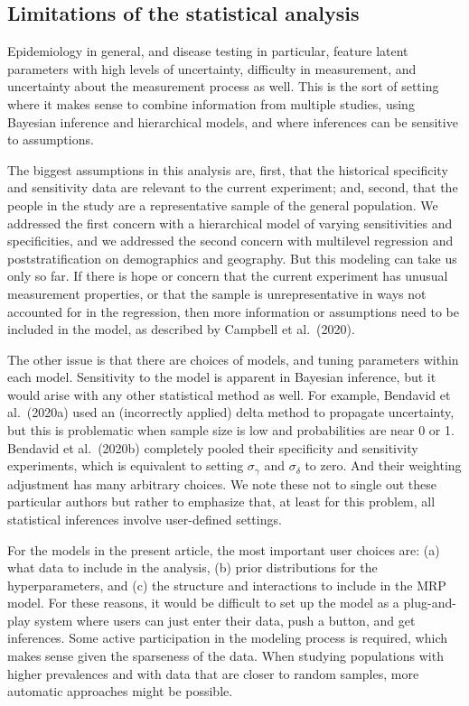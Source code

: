 \documentclass[11pt]{article}
\begin{document}
\subsection{Limitations of the statistical analysis}

Epidemiology in general, and disease testing in particular, feature
latent parameters with high levels of uncertainty, difficulty in
measurement, and uncertainty about the measurement process as well.
This is the sort of setting where it makes sense to combine
information from multiple studies, using Bayesian inference and
hierarchical models, and where inferences can be sensitive to
assumptions.

The biggest assumptions in this analysis are, first, that the
historical specificity and sensitivity data are relevant to the
current experiment; and, second, that the people in the study are a
representative sample of the general population.  We addressed the
first concern with a hierarchical model of varying sensitivities and
specificities, and we addressed the second concern with multilevel
regression and poststratification on demographics and geography.  But
this modeling can take us only so far.  If there is hope or concern
that the current experiment has unusual measurement properties, or
that the sample is unrepresentative in ways not accounted for in the
regression, then more information or assumptions need to be included
in the model, as described by Campbell et al.\ (2020).

The other issue is that there are choices of models, and tuning
parameters within each model.  Sensitivity to the model is apparent in
Bayesian inference, but it would arise with any other statistical
method as well.  For example, Bendavid et al.\ (2020a) used an
(incorrectly applied) delta method to propagate uncertainty, but this
is problematic when sample size is low and probabilities are near 0 or
1.  Bendavid et al.\ (2020b) completely pooled their specificity and
sensitivity experiments, which is equivalent to setting
$\sigma_{\gamma}$ and $\sigma_{\delta}$ to zero.  And their weighting
adjustment has many arbitrary choices.  We note these not to single
out these particular authors but rather to emphasize that, at least
for this problem, all statistical inferences involve user-defined
settings.

For the models in the present article, the most important user choices
are: (a) what data to include in the analysis, (b) prior distributions
for the hyperparameters, and (c) the structure and interactions to
include in the MRP model.  For these reasons, it would be difficult to
set up the model as a plug-and-play system where users can just enter
their data, push a button, and get inferences.  Some active
participation in the modeling process is required, which makes sense
given the sparseness of the data.  When studying populations with
higher prevalences and with data that are closer to random samples,
more automatic approaches might be possible.
\end{document}
